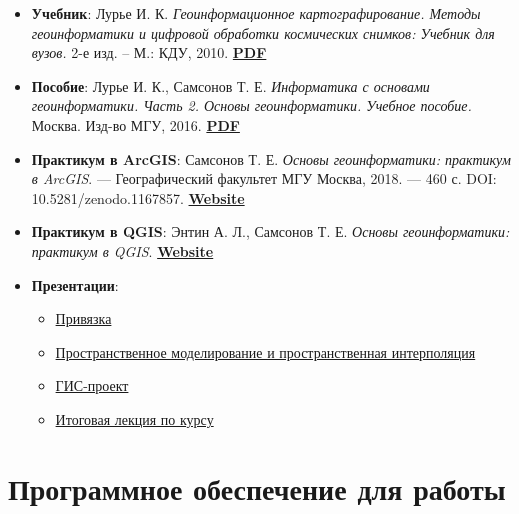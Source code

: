 \documentclass[
  12pt,
]{book}
\begin{document}
\begin{itemize}
\item
  \textbf{Учебник}: Лурье И. К. \emph{Геоинформационное картографирование. Методы геоинформатики и цифровой обработки космических снимков: Учебник для вузов.} 2-е изд. -- М.: КДУ, 2010. \href{https://istina.msu.ru/download/295728157/1jUpeD:roxrGk69x0LxZCpC5w_KNV0o390/}{\textbf{PDF}}
\item
  \textbf{Пособие}: Лурье И. К., Самсонов Т. Е. \emph{Информатика с основами геоинформатики. Часть 2. Основы геоинформатики. Учебное пособие.} Москва. Изд-во МГУ, 2016. \href{https://istina.msu.ru/download/45821659/1ej66u:uSUtcUS-XmdMMyRRpC-yflDmCv8/}{\textbf{PDF}}
\item
  \textbf{Практикум в ArcGIS}: Самсонов Т. Е. \emph{Основы геоинформатики: практикум в ArcGIS}. --- Географический факультет МГУ Москва, 2018. --- 460 с. DOI: 10.5281/zenodo.1167857. \href{https://tsamsonov.github.io/arcgis-course/}{\textbf{Website}}
\item
  \textbf{Практикум в QGIS}: Энтин А. Л., Самсонов Т. Е. \emph{Основы геоинформатики: практикум в QGIS}. \href{https://aentin.github.io/qgis-course/}{\textbf{Website}}
\item
  \textbf{Презентации}:

  \begin{itemize}
  \item
    \href{https://1drv.ms/p/s!AmtmZDq3JgxHgZ1VMkl568n2flOdyg?e=zjwgJt}{Привязка}
  \item
    \href{https://1drv.ms/p/s!AmtmZDq3JgxHgZ1X_f0g_iu-lbC-dg?e=mW6Jjb}{Пространственное моделирование и пространственная интерполяция}
  \item
    \href{https://1drv.ms/p/s!AmtmZDq3JgxHgZ1Umn-wlCou1CFBFQ?e=TqyBy5}{ГИС-проект}
  \item
    \href{https://1drv.ms/p/s!AmtmZDq3JgxHgZ1WdopazJmTuqeE8A?e=WeWhcG}{Итоговая лекция по курсу}
  \end{itemize}
\end{itemize}

\hypertarget{ux43fux440ux43eux433ux440ux430ux43cux43cux43dux43eux435-ux43eux431ux435ux441ux43fux435ux447ux435ux43dux438ux435-ux434ux43bux44f-ux440ux430ux431ux43eux442ux44b}{%
\section*{Программное обеспечение для работы}\label{ux43fux440ux43eux433ux440ux430ux43cux43cux43dux43eux435-ux43eux431ux435ux441ux43fux435ux447ux435ux43dux438ux435-ux434ux43bux44f-ux440ux430ux431ux43eux442ux44b}}
\end{document}
